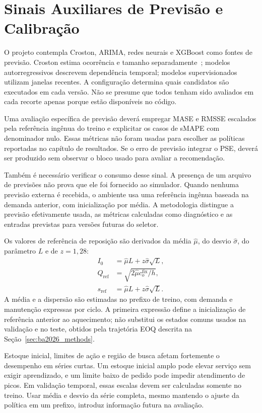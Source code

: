 \section{Sinais Auxiliares de Previsão e Calibração}
\label{sec:sinais_previsao}

O projeto contempla Croston, ARIMA, redes neurais e XGBoost como fontes de previsão. Croston estima ocorrência e tamanho separadamente~\citep{Croston1972ForecastingIntermittentDemand}; modelos autorregressivos descrevem dependência temporal; modelos supervisionados utilizam janelas recentes. A configuração determina quais candidatos são executados em cada versão. Não se presume que todos tenham sido avaliados em cada recorte apenas porque estão disponíveis no código.

Uma avaliação específica de previsão deverá empregar MASE e RMSSE escalados pela referência ingênua do treino e explicitar os casos de sMAPE com denominador nulo. Essas métricas não foram usadas para escolher as políticas reportadas no capítulo de resultados. Se o erro de previsão integrar o PSE, deverá ser produzido sem observar o bloco usado para avaliar a recomendação.

Também é necessário verificar o consumo desse sinal. A presença de um arquivo de previsões não prova que ele foi fornecido ao simulador. Quando nenhuma previsão externa é recebida, o ambiente usa uma referência ingênua baseada na demanda anterior, com inicialização por média. A metodologia distingue a previsão efetivamente usada, as métricas calculadas como diagnóstico e as entradas previstas para versões futuras do seletor.

Os valores de referência de reposição são derivados da média $\hat\mu$, do desvio $\hat\sigma$, do parâmetro $L$ e de $z=1{,}28$:
\begin{align}
I_0&=\hat\mu L+z\hat\sigma\sqrt L,\label{eq:I0_metod}\\
Q_{\mathrm{ref}}&=\sqrt{2\hat\mu c_o^{\mathrm{fix}}/h},\label{eq:qref_metod}\\
s_{\mathrm{ref}}&=\hat\mu L+z\hat\sigma\sqrt L.\label{eq:sref_metod}
\end{align}
A média e a dispersão são estimadas no prefixo de treino, com demanda e manutenção expressas por ciclo. A primeira expressão define a inicialização de referência anterior ao aquecimento; não substitui os estados comuns usados na validação e no teste, obtidos pela trajetória EOQ descrita na Seção~\ref{sec:ba2026_methods}.

Estoque inicial, limites de ação e região de busca afetam fortemente o desempenho em séries curtas. Um estoque inicial amplo pode elevar serviço sem exigir aprendizado, e um limite baixo de pedido pode impedir atendimento de picos. Em validação temporal, essas escalas devem ser calculadas somente no treino. Usar média e desvio da série completa, mesmo mantendo o ajuste da política em um prefixo, introduz informação futura na avaliação.

